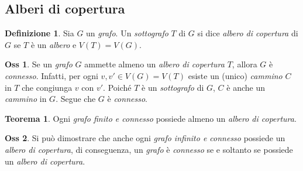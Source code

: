 \documentclass[12pt, a4paper]{report}
\theoremstyle{definition}
\newtheorem{definition}{Definizione}[section]
\newtheorem{theorem}{Teorema}[section]
\newtheorem{observation}{Oss}[section]
\begin{document}
\subsection{Alberi di copertura}
\begin{definition}
    Sia $G$ un \emph{grafo}. Un \emph{sottografo} $T$ di $G$ si dice \emph{albero
    di copertura} di $G$ se $T$ è un \emph{albero} e $V(T)=V(G)$.
\end{definition}
\begin{observation}
    Se un \emph{grafo} $G$ ammette almeno un \emph{albero di copertura} $T$, allora
    $G$ è \emph{connesso}. Infatti, per ogni $v,v'\in V(G)=V(T)$ esiste un (unico)
    \emph{cammino} $C$ in $T$ che congiunga $v$ con $v'$. Poiché $T$ è un
    \emph{sottografo} di $G$, $C$ è anche un \emph{cammino} in $G$. Segue che $G$
    è \emph{connesso}. 
\end{observation}

\begin{theorem}
    Ogni \emph{grafo finito e connesso} possiede almeno un \emph{albero di copertura}.
\end{theorem}
\begin{observation}
    Si può dimostrare che anche ogni \emph{grafo infinito e connesso} possiede un
    \emph{albero di copertura}, di conseguenza, un \emph{grafo} è \emph{connesso}
    se e soltanto se possiede un \emph{albero di copertura}.
\end{observation}
\end{document}
